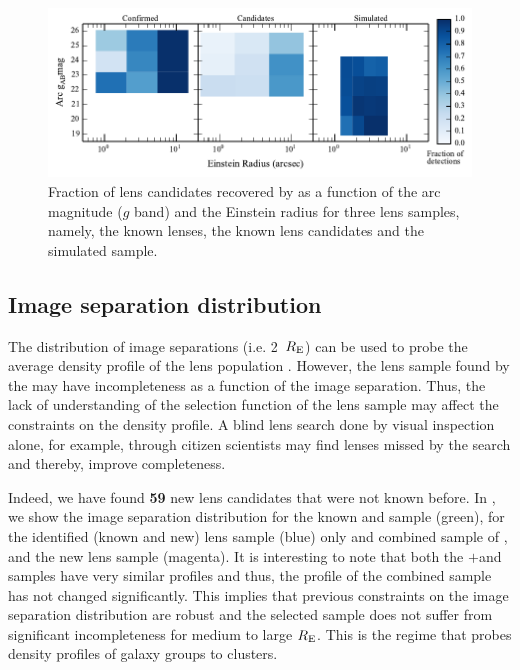\documentclass[useAMS,usenatbib,a4paper]{mn2e}
\begin{document}
\begin{figure}
\begin{center}
\includegraphics[scale=1.0]{comp_reinst_mag.pdf}
\caption{ \label{fig:compre} Fraction of lens candidates recovered by \sw as a
function of the arc magnitude ($g$ band) and the Einstein radius for three lens
samples, namely, the known lenses, the known lens candidates and the simulated
sample. }
\end{center}
\end{figure}


\subsection{Image separation distribution}
\label{sec:results:isd}

The distribution of image separations (i.e. 2~$R_{\rm E}$)
can be used to probe the average density profile of the lens population
\citep{Oguri2006,More2012}.  However, the lens sample found by the \af
may have incompleteness as a function of the image separation. Thus, the
lack of understanding of the selection function of the lens sample may
affect the constraints on the density profile. A blind lens search done
by visual inspection alone, for example, through \sw citizen scientists may find
lenses missed by the \af search and thereby, improve completeness.

Indeed, we have found {\bf 59} new lens candidates that were not known
before. In , we show the image separation distribution for
the known \rf and \af sample (green), for the \sw identified (known and
new) lens sample (blue) only and combined \cfhtls sample of \rf, \af and
the new \sw lens sample (magenta). It is interesting to note that both
the \rf$+$\af and \sw samples have very similar profiles and thus, the profile of the
combined sample has not changed significantly. This implies that previous
constraints on the image separation distribution are robust and the \af
selected sample does not suffer from significant incompleteness for
medium to large $R_{\rm E}$. This is the regime that probes density
profiles of galaxy groups to clusters.
\end{document}
